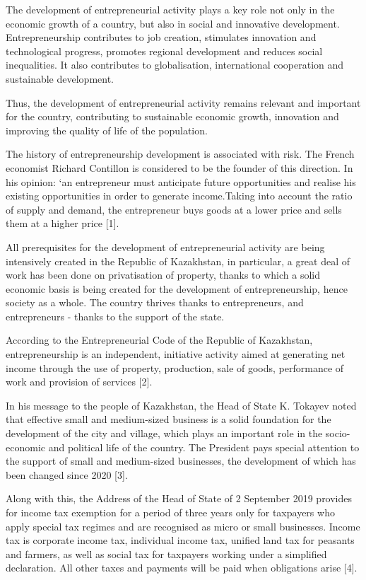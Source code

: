The development of entrepreneurial activity plays a key role not only in
the economic growth of a country, but also in social and innovative
development. Entrepreneurship contributes to job creation, stimulates
innovation and technological progress, promotes regional development and
reduces social inequalities. It also contributes to globalisation,
international cooperation and sustainable development.

Thus, the development of entrepreneurial activity remains relevant and
important for the country, contributing to sustainable economic growth,
innovation and improving the quality of life of the population.

The history of entrepreneurship development is associated with risk. The
French economist Richard Contillon is considered to be the founder of
this direction. In his opinion: `an entrepreneur must anticipate future
opportunities and realise his existing opportunities in order to
generate income.Taking into account the ratio of supply and demand, the
entrepreneur buys goods at a lower price and sells them at a higher
price {[}1{]}.

All prerequisites for the development of entrepreneurial activity are
being intensively created in the Republic of Kazakhstan, in particular,
a great deal of work has been done on privatisation of property, thanks
to which a solid economic basis is being created for the development of
entrepreneurship, hence society as a whole. The country thrives thanks
to entrepreneurs, and entrepreneurs - thanks to the support of the
state.

According to the Entrepreneurial Code of the Republic of Kazakhstan,
entrepreneurship is an independent, initiative activity aimed at
generating net income through the use of property, production, sale of
goods, performance of work and provision of services {[}2{]}.

In his message to the people of Kazakhstan, the Head of State K. Tokayev
noted that effective small and medium-sized business is a solid
foundation for the development of the city and village, which plays an
important role in the socio-economic and political life of the country.
The President pays special attention to the support of small and
medium-sized businesses, the development of which has been changed since
2020 {[}3{]}.

Along with this, the Address of the Head of State of 2 September 2019
provides for income tax exemption for a period of three years only for
taxpayers who apply special tax regimes and are recognised as micro or
small businesses. Income tax is corporate income tax, individual income
tax, unified land tax for peasants and farmers, as well as social tax
for taxpayers working under a simplified declaration. All other taxes
and payments will be paid when obligations arise {[}4{]}.


